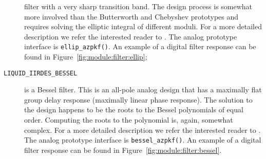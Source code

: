 \begin{description}
    filter with a very sharp transition band.
    The design process is somewhat more involved than the Butterworth and
    Chebyshev prototypes and requires solving the elliptic integral of
    different moduli.
    For a more detailed description we refer the interested reader to
    \cite{Orfanidis:2006}.
    The analog prototype interface is {\tt ellip\_azpkf()}.
    An example of a digital filter response can be found in
    Figure~\ref{fig:module:filter:ellip};
\item[{\tt LIQUID\_IIRDES\_BESSEL}]
    is a Bessel filter.
    This is an all-pole analog design that has a maximally flat group delay
    response (maximally linear phase response).
    The solution to the design happens to be the roots to the Bessel
    polynomials of equal order.
    Computing the roots to the polynomial is, again, somewhat complex.
    For a more detailed description we refer the interested reader to
    \cite{Orchard:1965}.
    The analog prototype interface is {\tt bessel\_azpkf()}.
    An example of a digital filter response can be found in
    Figure~\ref{fig:module:filter:bessel}.
\end{description}

% 
%

